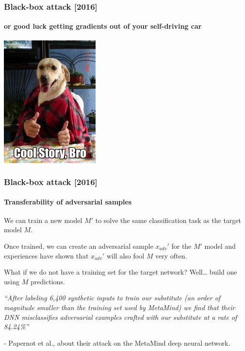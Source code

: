\documentclass[9pt]{beamer}
\begin{document}
\begin{frame}
  \frametitle{Black-box attack [2016]}

  \framesubtitle{or good luck getting gradients out of your
    self-driving car}

  \begin{center}
    \includegraphics[width = 5cm]{images/cool_story_bro_1.jpg}
  \end{center}

\end{frame}

\begin{frame}
  \frametitle{Black-box attack [2016]}

  \framesubtitle{Transferability of adversarial samples}


  We can train a new model $M'$ to solve the same classification task
  as the target model $M$.

  \pause

  \bigskip

  Once trained, we can create an adversarial sample $x_{adv}'$ for the
  $M'$ model and experiences have shown that $x_{adv}'$ will also fool
  $M$ very often.

  \pause

  \bigskip

  What if we do not have a training set for the target network?
  Well\dots{} build one using $M$ predictions.

  \pause

  \bigskip

  \textit{``After labeling 6,400 synthetic inputs to train our
    substitute (an order of magnitude smaller than the training set
    used by MetaMind) we find that their DNN misclassifies adversarial
    examples crafted with our substitute at a rate of 84.24\%''}

  \smallskip

  - Papernot et al., about their attack on the MetaMind deep neural
  network.

\end{frame}
\end{document}
